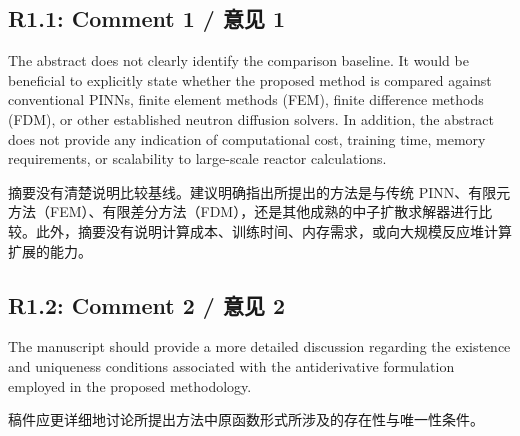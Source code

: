 \documentclass[11pt,a4paper,twoside]{article}
\begin{document}
\subsection{R1.1: Comment 1 / 意见 1}
\begin{englishcomment}
The abstract does not clearly identify the comparison baseline. It would be beneficial to explicitly state whether the proposed method is compared against conventional PINNs, finite element methods (FEM), finite difference methods (FDM), or other established neutron diffusion solvers. In addition, the abstract does not provide any indication of computational cost, training time, memory requirements, or scalability to large-scale reactor calculations.
\end{englishcomment}
\begin{chinesecomment}
摘要没有清楚说明比较基线。建议明确指出所提出的方法是与传统 PINN、有限元方法（FEM）、有限差分方法（FDM），还是其他成熟的中子扩散求解器进行比较。此外，摘要没有说明计算成本、训练时间、内存需求，或向大规模反应堆计算扩展的能力。
\end{chinesecomment}
\begin{revisionidea}
\end{revisionidea}

\subsection{R1.2: Comment 2 / 意见 2}
\begin{englishcomment}
The manuscript should provide a more detailed discussion regarding the existence and uniqueness conditions associated with the antiderivative formulation employed in the proposed methodology.
\end{englishcomment}
\begin{chinesecomment}
稿件应更详细地讨论所提出方法中原函数形式所涉及的存在性与唯一性条件。
\end{chinesecomment}
\begin{revisionidea}
\end{revisionidea}

\end{document}
